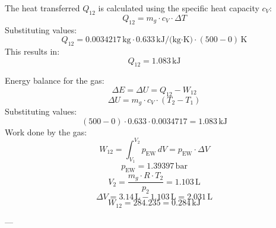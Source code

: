 The heat transferred \( Q_{12} \) is calculated using the specific heat capacity \( c_V \):  
\[
Q_{12} = m_g \cdot c_V \cdot \Delta T
\]  
Substituting values:  
\[
Q_{12} = 0.0034217 \, \text{kg} \cdot 0.633 \, \text{kJ/(kg·K)} \cdot (500 - 0) \, \text{K}
\]  
This results in:  
\[
Q_{12} = 1.083 \, \text{kJ}
\]

Energy balance for the gas:  
\[
\Delta E = \Delta U = Q_{12} - W_{12}
\]  
\[
\Delta U = m_g \cdot c_V \cdot (T_2 - T_1)
\]  
Substituting values:  
\[
(500 - 0) \cdot 0.633 \cdot 0.0034717 = 1.083 \, \text{kJ}
\]  
Work done by the gas:  
\[
W_{12} = \int_{V_1}^{V_2} p_{\text{EW}} \, dV = p_{\text{EW}} \cdot \Delta V
\]  
\[
p_{\text{EW}} = 1.39397 \, \text{bar}
\]  
\[
V_2 = \frac{m_g \cdot R \cdot T_2}{p_2} = 1.103 \, \text{L}
\]  
\[
\Delta V = 3.14 \, \text{L} - 1.103 \, \text{L} = 2.031 \, \text{L}
\]  
\[
W_{12} = 284.235 = 0.284 \, \text{kJ}
\]  

---